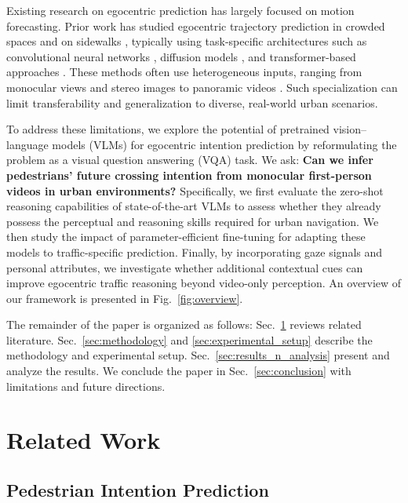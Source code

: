 \documentclass[letterpaper, 10pt, journal]{IEEEtran}  %
\begin{document}
Existing research on egocentric prediction has largely focused on motion forecasting. Prior work has studied egocentric trajectory prediction in crowded spaces \cite{qiu_egocentric_2022} and on sidewalks \cite{singh_krishnacam_2016, pan2025lookout}, typically using task-specific architectures such as convolutional neural networks \cite{singh_krishnacam_2016}, diffusion models \cite{wang_egonav_2024}, and transformer-based approaches \cite{qiu_egocognav_2025}. These methods often use heterogeneous inputs, ranging from monocular views \cite{pan2025lookout, qiu_egocognav_2025} and stereo images \cite{park2016egocentric} to panoramic videos \cite{wang_egonav_2024}. Such specialization can limit transferability and generalization to diverse, real-world urban scenarios.

To address these limitations, we explore the potential of pretrained vision--language models (VLMs) for egocentric intention prediction by reformulating the problem as a visual question answering (VQA) task.
We ask: \textbf{Can we infer pedestrians' future crossing intention from monocular first-person videos in urban environments?}
Specifically, we first evaluate the zero-shot reasoning capabilities of state-of-the-art VLMs to assess whether they already possess the perceptual and reasoning skills required for urban navigation. We then study the impact of parameter-efficient fine-tuning for adapting these models to traffic-specific prediction. Finally, by incorporating gaze signals and personal attributes, we investigate whether additional contextual cues can improve egocentric traffic reasoning beyond video-only perception.
An overview of our framework is presented in Fig.~\ref{fig:overview}.

The remainder of the paper is organized as follows: Sec.~\ref{sec:related_work} reviews related literature. Sec.~\ref{sec:methodology} and \ref{sec:experimental_setup} describe the methodology and experimental setup. Sec.~\ref{sec:results_n_analysis} present and analyze the results. We conclude the paper in Sec.~\ref{sec:conclusion} with limitations and future directions. 


\section{Related Work}
\label{sec:related_work}

\subsection{Pedestrian Intention Prediction}
\end{document}
